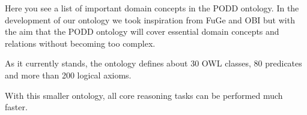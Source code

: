 \documentclass[ignorenonframetext,compress]{beamer}
\begin{document}

Here you see a list of important domain concepts in the PODD ontology.
In the development of our ontology we took inspiration from FuGe and OBI
but with the aim that the PODD ontology will cover essential domain
concepts and relations without becoming too complex.

As it currently stands, the ontology defines about 30 OWL classes, 80
predicates and more than 200 logical axioms. 

With this smaller ontology, all core reasoning tasks can be performed
much faster.
\end{document}
